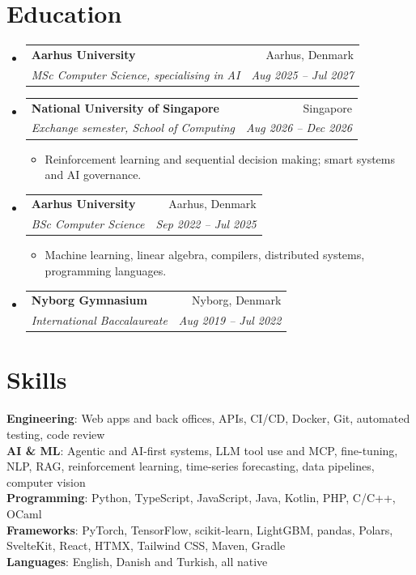 \documentclass[a4paper,11pt]{article}
\makeatletter
\newcommand{\resumeItem}[1]{\item\small #1}
\newcommand{\resumeSubheading}[4]{
  \vspace{-2pt}\item
    \begin{tabular*}{0.97\textwidth}[t]{l@{\extracolsep{\fill}}r}
      \textbf{#1} & #2 \\
      \textit{\small#3} & \textit{\small #4} \\
    \end{tabular*}\vspace{-8pt}
}
\newcommand{\resumeSubHeadingListStart}{\begin{itemize}[leftmargin=0.15in, label={}, itemsep=0pt, topsep=0pt]}
\newcommand{\resumeSubHeadingListEnd}{\end{itemize}}
\newcommand{\resumeItemListStart}{\begin{itemize}[itemsep=0.5pt, topsep=2pt, parsep=0pt]}
\newcommand{\resumeItemListEnd}{\end{itemize}\vspace{-8pt}}
\makeatother
\begin{document}
\section{Education}
  \resumeSubHeadingListStart
    \resumeSubheading
      {Aarhus University}{Aarhus, Denmark}
      {MSc Computer Science, specialising in AI}{Aug 2025 -- Jul 2027}
    \resumeSubheading
      {National University of Singapore}{Singapore}
      {Exchange semester, School of Computing}{Aug 2026 -- Dec 2026}
      \resumeItemListStart
        \resumeItem{Reinforcement learning and sequential decision making; smart systems and AI governance.}
      \resumeItemListEnd
    \resumeSubheading
      {Aarhus University}{Aarhus, Denmark}
      {BSc Computer Science}{Sep 2022 -- Jul 2025}
      \resumeItemListStart
        \resumeItem{Machine learning, linear algebra, compilers, distributed systems, programming languages.}
      \resumeItemListEnd
    \resumeSubheading
      {Nyborg Gymnasium}{Nyborg, Denmark}
      {International Baccalaureate}{Aug 2019 -- Jul 2022}
  \resumeSubHeadingListEnd

\section{Skills}
 \begin{itemize}[leftmargin=0.15in, label={}]
    \small{\item{
     \textbf{Engineering}{: Web apps and back offices, APIs, CI/CD, Docker, Git, automated testing, code review} \\
     \textbf{AI \& ML}{: Agentic and AI-first systems, LLM tool use and MCP, fine-tuning, NLP, RAG, reinforcement learning, time-series forecasting, data pipelines, computer vision} \\
     \textbf{Programming}{: Python, TypeScript, JavaScript, Java, Kotlin, PHP, C/C++, OCaml} \\
     \textbf{Frameworks}{: PyTorch, TensorFlow, scikit-learn, LightGBM, pandas, Polars, SvelteKit, React, HTMX, Tailwind CSS, Maven, Gradle} \\
     \textbf{Languages}{: English, Danish and Turkish, all native}
    }}
 \end{itemize}
\end{document}
